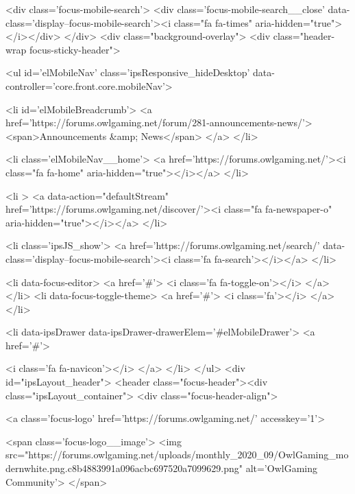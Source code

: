 			
<div class='focus-mobile-search'>
	<div class='focus-mobile-search__close' data-class='display--focus-mobile-search'><i class="fa fa-times" aria-hidden="true"></i></div>
</div>
			<div class="background-overlay">
      			<div class="header-wrap focus-sticky-header">
                  	
<ul id='elMobileNav' class='ipsResponsive_hideDesktop' data-controller='core.front.core.mobileNav'>
	
		
			
			
				
				
			
				
					<li id='elMobileBreadcrumb'>
						<a href='https://forums.owlgaming.net/forum/281-announcements-news/'>
							<span>Announcements &amp; News</span>
						</a>
					</li>
				
				
			
				
				
			
		
	
  
	<li class='elMobileNav__home'>
		<a href='https://forums.owlgaming.net/'><i class="fa fa-home" aria-hidden="true"></i></a>
	</li>
	
	
	<li >
		<a data-action="defaultStream" href='https://forums.owlgaming.net/discover/'><i class="fa fa-newspaper-o" aria-hidden="true"></i></a>
	</li>

	

	
		<li class='ipsJS_show'>
			<a href='https://forums.owlgaming.net/search/' data-class='display--focus-mobile-search'><i class='fa fa-search'></i></a>
		</li>
	

	
<li data-focus-editor>
	<a href='#'>
		<i class='fa fa-toggle-on'></i>
	</a>
</li>
<li data-focus-toggle-theme>
	<a href='#'>
		<i class='fa'></i>
	</a>
</li>
  	
	<li data-ipsDrawer data-ipsDrawer-drawerElem='#elMobileDrawer'>
		<a href='#'>
			
			
				
			
			
			
			<i class='fa fa-navicon'></i>
		</a>
	</li>
</ul>
					<div id="ipsLayout_header">
						<header class="focus-header"><div class="ipsLayout_container">
								<div class="focus-header-align">
									
<a class='focus-logo' href='https://forums.owlgaming.net/' accesskey='1'>
	
		
		<span class='focus-logo__image'>
			<img src="https://forums.owlgaming.net/uploads/monthly_2020_09/OwlGaming_modernwhite.png.c8b4883991a096acbc697520a7099629.png" alt='OwlGaming Community'>
		</span>
		
